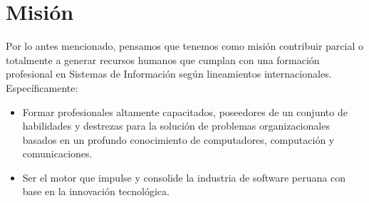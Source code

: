 \section{Misión}\label{sec:cs-mision}
Por lo antes mencionado, pensamos que tenemos como misión contribuir parcial o totalmente a generar recursos humanos 
que cumplan con una formación profesional en Sistemas de Información según lineamientos internacionales. Específicamente:

\begin{itemize}
\item Formar profesionales altamente capacitados, poseedores de un conjunto de habilidades y destrezas para 
	la solución de problemas organizacionales basados en un profundo conocimiento de computadores, 
	computación y comunicaciones.
\item Ser el motor que impulse y consolide la industria de software peruana con base en la innovación 
	tecnológica.
\end{itemize}